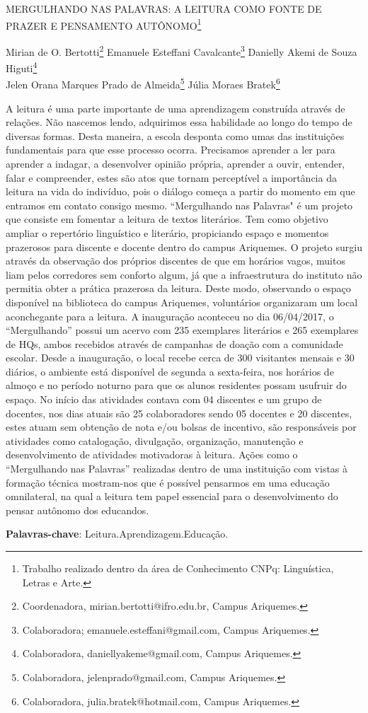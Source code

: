 \documentclass[article,12pt,onesidea,4paper,english,brazil]{abntex2}
\begin{document}
	
	
	\frenchspacing 
	
	\begin{center}
		\LARGE MERGULHANDO NAS PALAVRAS: A LEITURA COMO FONTE DE PRAZER E
		PENSAMENTO AUTÔNOMO\footnote{Trabalho realizado dentro da área de Conhecimento CNPq: Linguística, Letras e Arte.}
		
		\normalsize
	Mirian de O. Bertotti\footnote{Coordenadora, mirian.bertotti@ifro.edu.br, Campus Ariquemes.} 
	Emanuele Esteffani Cavalcante\footnote{Colaboradora; emanuele.esteffani@gmail.com, Campus Ariquemes.} 
	Danielly Akemi de Souza Higuti\footnote{Colaboradora, daniellyakeme@gmail.com, Campus Ariquemes.} \\
	Jelen Orana Marques Prado de Almeida\footnote{Colaboradora, jelenprado@gmail.com, Campus Ariquemes.} 
     Júlia Moraes Bratek\footnote{Colaboradora, julia.bratek@hotmail.com, Campus Ariquemes.} 
	\end{center}
	
	\noindent A leitura é uma parte importante de uma aprendizagem construída através de
	relações. Não nascemos lendo, adquirimos essa habilidade ao longo do tempo de
	diversas formas. Desta maneira, a escola desponta como umas das instituições
	fundamentais para que esse processo ocorra. Precisamos aprender a ler para
	aprender a indagar, a desenvolver opinião própria, aprender a ouvir, entender, falar
	e compreender, estes são atos que tornam perceptível a importância da leitura na
	vida do indivíduo, pois o diálogo começa a partir do momento em que entramos em
	contato consigo mesmo. “Mergulhando nas Palavras" é um projeto que consiste em
	fomentar a leitura de textos literários. Tem como objetivo ampliar o repertório
	linguístico e literário, propiciando espaço e momentos prazerosos para discente e
	docente dentro do campus Ariquemes. O projeto surgiu através da observação dos
	próprios discentes de que em horários vagos, muitos liam pelos corredores sem
	conforto algum, já que a infraestrutura do instituto não permitia obter a prática
	prazerosa da leitura. Deste modo, observando o espaço disponível na biblioteca do
	campus Ariquemes, voluntários organizaram um local aconchegante para a leitura. A
	inauguração aconteceu no dia 06/04/2017, o “Mergulhando” possui um acervo com
	235 exemplares literários e 265 exemplares de HQs, ambos recebidos através de
	campanhas de doação com a comunidade escolar. Desde a inauguração, o local
	recebe cerca de 300 visitantes mensais e 30 diários, o ambiente está disponível de
	segunda a sexta-feira, nos horários de almoço e no período noturno para que os
	alunos residentes possam usufruir do espaço. No início das atividades contava com
	04 discentes e um grupo de docentes, nos dias atuais são 25 colaboradores sendo
	05 docentes e 20 discentes, estes atuam sem obtenção de nota e/ou bolsas de
	incentivo, são responsáveis por atividades como catalogação, divulgação,
	organização, manutenção e desenvolvimento de atividades motivadoras à leitura.
	Ações como o “Mergulhando nas Palavras” realizadas dentro de uma instituição com
	vistas à formação técnica mostram-nos que é possível pensarmos em uma
	educação omnilateral, na qual a leitura tem papel essencial para o desenvolvimento
	do pensar autônomo dos educandos.
	
	\vspace{\onelineskip}
	
	\noindent
	\textbf{Palavras-chave}: Leitura.Aprendizagem.Educação.
	
\end{document}
